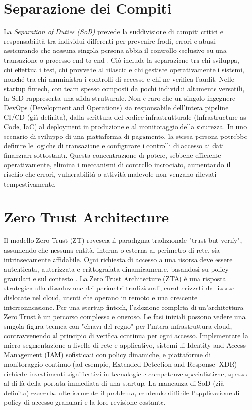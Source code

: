 \section{Separazione dei Compiti}
La \textit{Separation of Duties (SoD)} prevede la suddivisione di compiti critici e responsabilità tra individui differenti per prevenire frodi, errori e abusi, assicurando che nessuna singola persona abbia il controllo esclusivo su una transazione o processo end-to-end \cite{OSCAL_Content}. Ciò include la separazione tra chi sviluppa, chi effettua i test, chi provvede al rilascio e chi gestisce operativamente i sistemi, nonché tra chi amministra i controlli di accesso e chi ne verifica l'audit.
Nelle startup fintech, con team spesso composti da pochi individui altamente versatili, la SoD rappresenta una sfida strutturale. Non è raro che un singolo ingegnere DevOps (Development and Operations) sia responsabile dell'intera pipeline CI/CD (già definita), dalla scrittura del codice infrastrutturale (Infrastructure as Code, IaC) al deployment in produzione e al monitoraggio della sicurezza. In uno scenario di sviluppo di una piattaforma di pagamento, la stessa persona potrebbe definire le logiche di transazione e configurare i controlli di accesso ai dati finanziari sottostanti. Questa concentrazione di potere, sebbene efficiente operativamente, elimina i meccanismi di controllo incrociato, aumentando il rischio che errori, vulnerabilità o attività malevole non vengano rilevati tempestivamente.
\section{Zero Trust Architecture}
Il modello Zero Trust (ZT) rovescia il paradigma tradizionale "trust but verify", assumendo che nessuna entità, interna o esterna al perimetro di rete, sia intrinsecamente affidabile. Ogni richiesta di accesso a una risorsa deve essere autenticata, autorizzata e crittografata dinamicamente, basandosi su policy granulari e sul contesto \cite{NIST_SP_800_207}. La Zero Trust Architecture (ZTA) è una risposta strategica alla dissoluzione dei perimetri tradizionali, caratterizzati da risorse dislocate nel cloud, utenti che operano in remoto e una crescente interconnessione.
Per una startup fintech, l'adozione completa di un'architettura Zero Trust è un percorso complesso e oneroso. Le fasi iniziali possono vedere una singola figura tecnica con "chiavi del regno" per l'intera infrastruttura cloud, contravvenendo al principio di verifica continua per ogni accesso. Implementare la micro-segmentazione a livello di rete e applicativo, sistemi di Identity and Access Management (IAM) sofisticati con policy dinamiche, e piattaforme di monitoraggio continuo (ad esempio, Extended Detection and Response, XDR) richiede investimenti significativi in tecnologie e competenze specialistiche, spesso al di là della portata immediata di una startup. La mancanza di SoD (già definita) esacerba ulteriormente il problema, rendendo difficile l'applicazione di policy di accesso granulari e la loro revisione costante.
